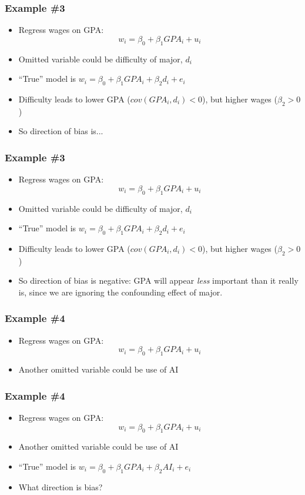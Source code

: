 \documentclass[aspectratio=169]{beamer}
\begin{document}
\begin{frame}
    \frametitle{Example \#3}
    \begin{itemize}
        \item Regress wages on GPA:
        $$ 
            w_i = \beta_0 + \beta_1 GPA_i + u_i
        $$
        \item Omitted variable could be difficulty of major, $d_i$
        \item ``True'' model is $w_i = \beta_0 + \beta_1 GPA_i + \beta_2 d_i + e_i$
        \item Difficulty leads to lower GPA ($cov(GPA_i, d_i) < 0$), but higher wages ($\beta_2 > 0$)
        \item So direction of bias is...
    \end{itemize}
\end{frame}

\begin{frame}
    \frametitle{Example \#3}
    \begin{itemize}
        \item Regress wages on GPA:
        $$ 
            w_i = \beta_0 + \beta_1 GPA_i + u_i
        $$
        \item Omitted variable could be difficulty of major, $d_i$
        \item ``True'' model is $w_i = \beta_0 + \beta_1 GPA_i + \beta_2 d_i + e_i$
        \item Difficulty leads to lower GPA ($cov(GPA_i, d_i) < 0$), but higher wages ($\beta_2 > 0$)
        \item So direction of bias is negative: GPA will appear \textit{less} important than it really is, since we are ignoring the confounding effect of major.
    \end{itemize}
\end{frame}

\begin{frame}
    \frametitle{Example \#4}
    \begin{itemize}
        \item Regress wages on GPA:
        $$ 
            w_i = \beta_0 + \beta_1 GPA_i + u_i
        $$
        \item Another omitted variable could be use of AI
    \end{itemize}
\end{frame}

\begin{frame}
    \frametitle{Example \#4}
    \begin{itemize}
        \item Regress wages on GPA:
        $$ 
            w_i = \beta_0 + \beta_1 GPA_i + u_i
        $$
        \item Another omitted variable could be use of AI
        \item ``True'' model is $w_i = \beta_0 + \beta_1 GPA_i + \beta_2 AI_i + e_i$
        \item What direction is bias?
    \end{itemize}
\end{frame}
\end{document}
